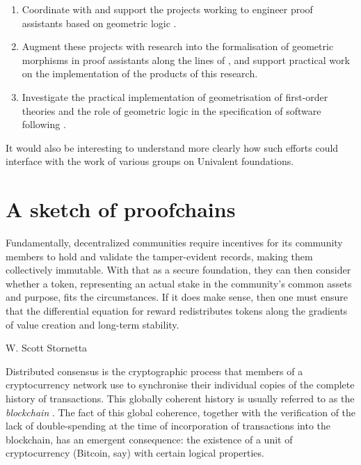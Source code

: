 \documentclass[english,letter paper,12pt,reqno]{article}
\theoremstyle{example}
\begin{document}
\begin{enumerate}
\item Coordinate with and support the projects working to engineer proof assistants based on geometric logic \cite{bezem2, stojanovic}.
\item Augment these projects with research into the formalisation of geometric morphisms in proof assistants along the lines of \cite{benton2}, and support practical work on the implementation of the products of this research.
\item Investigate the practical implementation of geometrisation of first-order theories and the role of geometric logic in the specification of software following \cite{vickers1,vickers2}.
\end{enumerate}

It would also be interesting to understand more clearly how such efforts could interface with the work of various groups on Univalent foundations.

\section{A sketch of proofchains}\label{section:proofchain}

\setlength{\epigraphwidth}{0.7\textwidth}
\epigraph{Fundamentally, decentralized communities require incentives for its community members to hold and validate the tamper-evident records, making them collectively immutable. With that as a secure foundation, they can then consider whether a token, representing an actual stake in the community's common assets and purpose, fits the circumstances. If it does make sense, then one must ensure that the differential equation for reward redistributes tokens along the gradients of value creation and long-term stability.}{W. Scott Stornetta}

Distributed consensus is the cryptographic process that members of a cryptocurrency network use to synchronise their individual copies of the complete history of transactions. This globally coherent history is usually referred to as the \emph{blockchain} \cite{satoshi}. The fact of this global coherence, together with the verification of the lack of double-spending at the time of incorporation of transactions into the blockchain, has an emergent consequence: the existence of a unit of cryptocurrency (Bitcoin, say) with certain logical properties.
\end{document}
